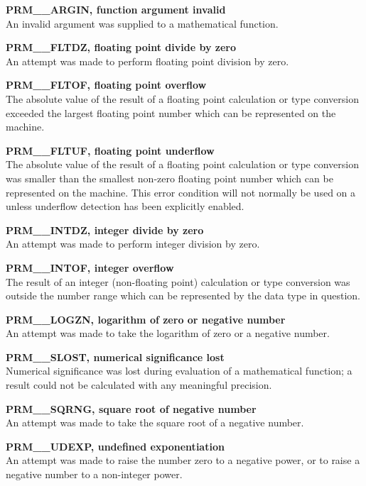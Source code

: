 \begin{description}

\item {\bf PRM\_\_ARGIN, function argument invalid}\\
An invalid argument was supplied to a mathematical function.

\item {\bf PRM\_\_FLTDZ, floating point divide by zero}\\
An attempt was made to perform floating point division by zero.

\item {\bf PRM\_\_FLTOF, floating point overflow}\\
The absolute value of the result of a floating point calculation or type 
conversion exceeded the largest floating point number which can be
represented on the machine. 

\item {\bf PRM\_\_FLTUF, floating point underflow}\\
The absolute value of the result of a floating point calculation or type 
conversion was smaller than the smallest non-zero floating point number
which can be represented on the machine.
This error condition will not normally be used on a  unless
underflow detection has been explicitly enabled. 

\item {\bf PRM\_\_INTDZ, integer divide by zero}\\
An attempt was made to perform integer division by zero.

\item {\bf PRM\_\_INTOF, integer overflow}\\
The result of an integer (non-floating point) calculation or type conversion 
was outside the number range which can be represented by the data type in
question. 

\item {\bf PRM\_\_LOGZN, logarithm of zero or negative number}\\
An attempt was made to take the logarithm of zero or a negative number.

\item {\bf PRM\_\_SLOST, numerical significance lost}\\
Numerical significance was lost during evaluation of a mathematical 
function; a result could not be calculated with any meaningful precision.

\item {\bf PRM\_\_SQRNG, square root of negative number}\\
An attempt was made to take the square root of a negative number.

\item {\bf PRM\_\_UDEXP, undefined exponentiation}\\
An attempt was made to raise the number zero to a negative power, or to raise a
negative number to a non-integer power.

\end{description}



